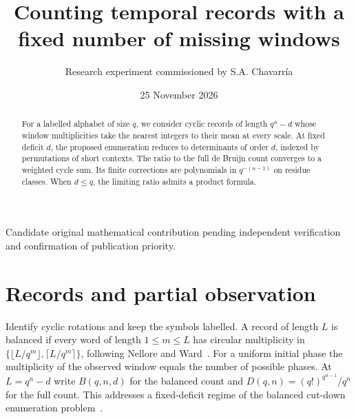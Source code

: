 \documentclass[11pt]{article}
\title{Counting temporal records with a fixed number of missing windows}
\author{Research experiment commissioned by S.A. Chavarría}
\date{25 November 2026}
\begin{document}
\maketitle
\begin{center}\small Candidate original mathematical contribution pending independent verification\\ and confirmation of publication priority.\end{center}
\begin{abstract}
For a labelled alphabet of size \(q\), we consider cyclic records of length \(q^n-d\) whose window multiplicities take the nearest integers to their mean at every scale. At fixed deficit \(d\), the proposed enumeration reduces to determinants of order \(d\), indexed by permutations of short contexts. The ratio to the full de Bruijn count converges to a weighted cycle sum. Its finite corrections are polynomials in \(q^{-(n-1)}\) on residue classes. When \(d\le q\), the limiting ratio admits a product formula.
\end{abstract}
\section{Records and partial observation}
Identify cyclic rotations and keep the symbols labelled. A record of length \(L\) is balanced if every word of length \(1\le m\le L\) has circular multiplicity in
\(\{\lfloor L/q^m\rfloor,\lceil L/q^m\rceil\}\), following Nellore and Ward~\cite{nw}.
For a uniform initial phase the multiplicity of the observed window equals the number of possible phases. At \(L=q^n-d\) write \(B(q,n,d)\) for the balanced count and \(D(q,n)=(q!)^{q^{n-1}}/q^n\) for the full count. This addresses a fixed-deficit regime of the balanced cut-down enumeration problem~\cite{catalogue}.
\end{document}
